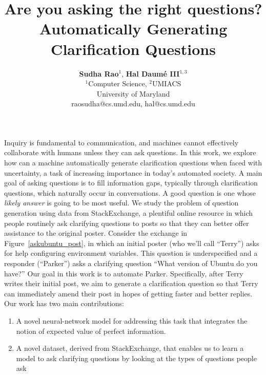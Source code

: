 \documentclass[11pt,a4paper]{article}
\title{Are you asking the right questions? \\ Automatically Generating Clarification Questions}
\author{ 
  \textbf{Sudha Rao}${}^{1}$\textnormal{,} \textbf{Hal Daum\'e III}${}^{1,3}$\\
  ${}^1$Computer Science,
  ${}^2$UMIACS\\
  University of Maryland\\
  raosudha@cs.umd.edu, hal@cs.umd.edu
  }
\date{}
\begin{document}
\maketitle
Inquiry is fundamental to communication, and machines cannot effectively collaborate with humans unless they can ask questions. In this work, we explore how can a machine automatically generate clarification questions when faced with uncertainty, a task of increasing importance in today's automated society. 
A main goal of asking questions is to fill information gaps, typically through clarification questions, which naturally occur in conversations. 
A good question is one whose \emph{likely answer} is going to be most useful.
We study the problem of question generation using data from StackExchange, a plentiful online resource in which people routinely ask clarifying questions to posts so that they can better offer assistance to the original poster. Consider the exchange in Figure~\ref{askubuntu_post}, in which an initial poster (who we'll call ``Terry'') asks for help configuring environment variables.
This question is underspecified and a responder (``Parker'') asks a clarifying question ``\textsf{\small What version of Ubuntu do you have?}''
Our goal in this work is to automate Parker.
Specifically, after Terry writes their initial post, we aim to generate a clarification question so that Terry can immediately amend their post in hopes of getting faster and better replies.
%
Our work has two main contributions: 
\begin{enumerate}
	\item A novel neural-network model for addressing this task that integrates the notion of expected value of perfect information. 
	\item A novel dataset, derived from StackExchange, that enables us to learn a model to ask clarifying questions by looking at the types of questions people ask 
\end{enumerate}
\end{document}
